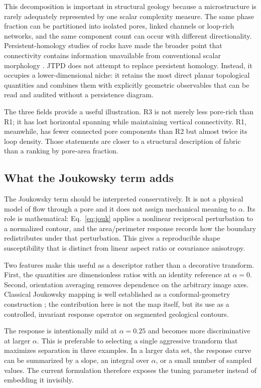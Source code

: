 \documentclass[preprint,12pt,authoryear]{elsarticle}
\begin{document}
This decomposition is important in structural geology because a microstructure is rarely adequately represented by one scalar complexity measure. The same phase fraction can be partitioned into isolated pores, linked channels or loop-rich networks, and the same component count can occur with different directionality. Persistent-homology studies of rocks have made the broader point that connectivity contains information unavailable from conventional scalar morphology \citep{Robins2016,Bizhani2021,Liu2026}. JTPD does not attempt to replace persistent homology. Instead, it occupies a lower-dimensional niche: it retains the most direct planar topological quantities and combines them with explicitly geometric observables that can be read and audited without a persistence diagram.

The three fields provide a useful illustration. R3 is not merely less pore-rich than R1; it has lost horizontal spanning while maintaining vertical connectivity. R1, meanwhile, has fewer connected pore components than R2 but almost twice its loop density. Those statements are closer to a structural description of fabric than a ranking by pore-area fraction.

\subsection{What the Joukowsky term adds}

The Joukowsky term should be interpreted conservatively. It is not a physical model of flow through a pore and it does not assign mechanical meaning to $\alpha$. Its role is mathematical: Eq.~\ref{eq:jouk} applies a nonlinear reciprocal perturbation to a normalized contour, and the area/perimeter response records how the boundary redistributes under that perturbation. This gives a reproducible shape susceptibility that is distinct from linear aspect ratio or covariance anisotropy.

Two features make this useful as a descriptor rather than a decorative transform. First, the quantities are dimensionless ratios with an identity reference at $\alpha=0$. Second, orientation averaging removes dependence on the arbitrary image axes. Classical Joukowsky mapping is well established as a conformal-geometry construction \citep{Repp1974}; the contribution here is not the map itself, but its use as a controlled, invariant response operator on segmented geological contours.

The response is intentionally mild at $\alpha=0.25$ and becomes more discriminative at larger $\alpha$. This is preferable to selecting a single aggressive transform that maximizes separation in three examples. In a larger data set, the response curve can be summarized by a slope, an integral over $\alpha$, or a small number of sampled values. The current formulation therefore exposes the tuning parameter instead of embedding it invisibly.
\end{document}
